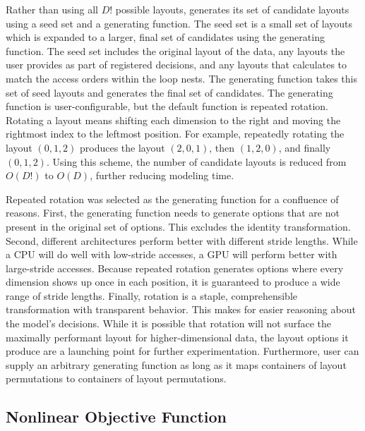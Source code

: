Rather than using all $D!$ possible layouts, \FormatDecisions{} generates its set of candidate layouts using a seed set and a generating function.
The seed set is a small set of layouts which is expanded to a larger, final set of candidates using the generating function.
The seed set includes the original layout of the data, any layouts the user provides as part of registered decisions, and any layouts that \FormatDecisions{} calculates to match the access orders within the loop nests.
The generating function takes this set of seed layouts and generates the final set of candidates.
The generating function is user-configurable, but the default function is repeated rotation.
Rotating a layout means shifting each dimension to the right and moving the rightmost index to the leftmost position.
For example, repeatedly rotating the layout $(0,1,2)$ produces the layout $(2,0,1)$, then $(1,2,0)$, and finally $(0,1,2)$. 
Using this scheme, the number of candidate layouts is reduced from $O(D!)$ to $O(D)$, further reducing modeling time.

Repeated rotation was selected as the generating function for a confluence of reasons.
First, the generating function needs to generate options that are not present in the original set of options.
This excludes the identity transformation.
Second, different architectures perform better with different stride lengths.
While a CPU will do well with low-stride accesses, a GPU will perform better with large-stride accesses.
Because repeated rotation generates options where every dimension shows up once in each position, it is guaranteed to produce a wide range of stride lengths.
Finally, rotation is a staple, comprehensible transformation with transparent behavior.
This makes for easier reasoning about the model's decisions.
While it is possible that rotation will not surface the maximally performant layout for higher-dimensional data, the layout options it produce are a launching point for further experimentation.
Furthermore, user can supply an arbitrary generating function as long as it maps containers of layout permutations to containers of layout permutations.

\subsection{Nonlinear Objective Function}\label{sec:nonlinearFunc}

